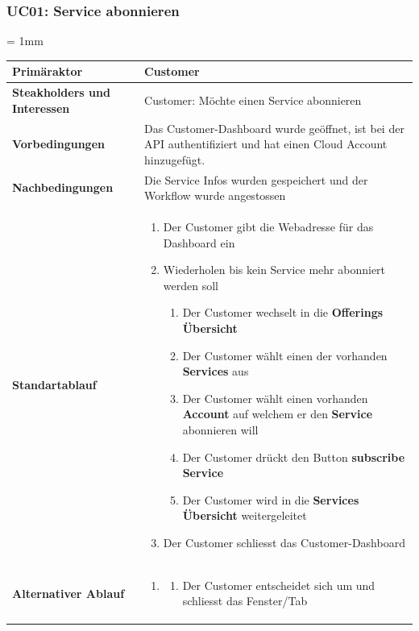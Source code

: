 \documentclass[11pt]{scrartcl}
\begin{document}
\subsubsection{UC01: Service abonnieren}
\belowtabulinesep = 1mm
\begin{longtabu} to \textwidth {X[1,l] X[2,l]}
	\bfseries Primäraktor & Customer  \\\hline 
	\bfseries Steakholders und Interessen & Customer: Möchte einen Service abonnieren  \\\hline 
	\bfseries Vorbedingungen & Das Customer-Dashboard wurde geöffnet, ist bei der API authentifiziert und 
	hat einen Cloud Account hinzugefügt. \\\hline 
	\bfseries Nachbedingungen & Die Service Infos wurden gespeichert und der Workflow wurde angestossen  
	\\\hline 
	\bfseries Standartablauf & 
		\begin{enumerate}
			\item Der Customer gibt die Webadresse für das Dashboard ein
			\item Wiederholen bis kein Service mehr abonniert werden soll
			\begin{enumerate}
			    \item Der Customer wechselt in die \textbf{Offerings Übersicht}
			    \item Der Customer wählt einen der vorhanden \textbf{Services} aus
			    \item Der Customer wählt einen vorhanden \textbf{Account} auf welchem er den \textbf{Service}
			abonnieren will
			    \item Der Customer drückt den Button \textbf{subscribe Service}
			    \item Der Customer wird in die \textbf{Services Übersicht} weitergeleitet
			\end{enumerate}
		\item Der Customer schliesst das Customer-Dashboard
		\end{enumerate}
      \\\hline
      	\bfseries Alternativer Ablauf & 
		\begin{enumerate}
		  
		\item
		  \begin{enumerate}
		    \item Der Customer entscheidet sich um und schliesst das 
		    Fenster/Tab
		    
		  \end{enumerate}
		  

\end{enumerate}
\end{longtabu}
\end{document}
